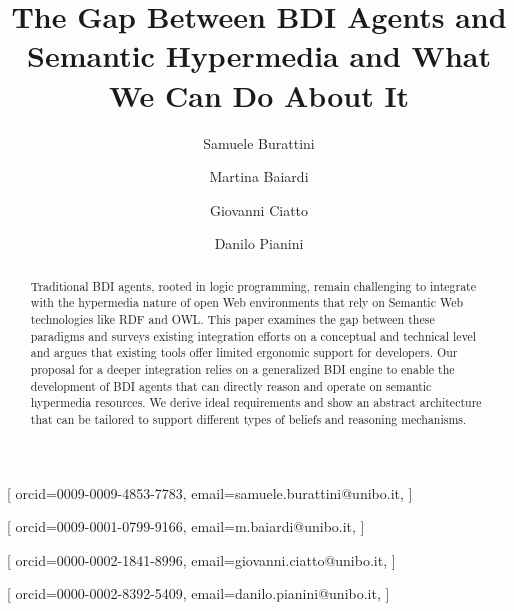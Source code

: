 \documentclass[
]{ceurart}
\begin{document}


\title{The Gap Between BDI Agents and Semantic Hypermedia and What We Can Do About It}


\author[1]{Samuele Burattini}[%
orcid=0009-0009-4853-7783,
email=samuele.burattini@unibo.it,
]
\cormark[1]
\fnmark[1]

\author[1]{Martina Baiardi}[%
orcid=0009-0001-0799-9166,
email=m.baiardi@unibo.it,
]
\fnmark[1]

\author[1]{Giovanni Ciatto}[%
orcid=0000-0002-1841-8996,
email=giovanni.ciatto@unibo.it,
]


\author[1]{Danilo Pianini}[%
orcid=0000-0002-8392-5409,
email=danilo.pianini@unibo.it,
]



\address[1]{\disi, \unibo}



\begin{abstract}
  Traditional BDI agents,
  rooted in logic programming,
  remain challenging to integrate with the hypermedia nature of open Web environments
  that rely on Semantic Web technologies like RDF and OWL.
  This paper examines the gap between these paradigms and surveys existing integration efforts on a conceptual and technical level 
  and argues that existing tools offer limited ergonomic support for developers.
  Our proposal for a deeper integration relies on a generalized BDI engine to enable the development of BDI agents that can directly reason and operate on semantic hypermedia resources.
  We derive ideal requirements and show an abstract architecture that can be tailored to support different types of beliefs and reasoning mechanisms.
\end{abstract}
\end{document}
